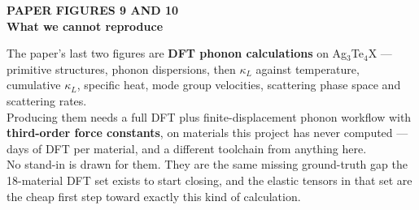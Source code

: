 \documentclass[aspectratio=169]{beamer}
\begin{document}
\begingroup
{}
\begin{frame}[plain]
\vspace{0.9cm}
\begin{center}
{\color{SlideAmber}\bfseries\sffamily\large PAPER FIGURES 9 AND 10}\\[8pt]
{\color{white}\bfseries\headingfont\fontsize{25}{30}\selectfont
  What we cannot reproduce}\\[12pt]
\begin{minipage}{0.80\linewidth}
{\color{Subtle}\sffamily\footnotesize
The paper's last two figures are \textbf{DFT phonon calculations} on
Ag$_3$Te$_4$X --- primitive structures, phonon dispersions, then $\kappa_L$
against temperature, cumulative $\kappa_L$, specific heat, mode group
velocities, scattering phase space and scattering rates.\\[8pt]
Producing them needs a full DFT plus finite-displacement phonon workflow with
\textbf{third-order force constants}, on materials this project has never
computed --- days of DFT per material, and a different toolchain from anything
here.\\[8pt]
{\color{white}No stand-in is drawn for them.} They are the same missing
ground-truth gap the 18-material DFT set exists to start closing, and the
elastic tensors in that set are the cheap first step toward exactly this kind
of calculation.}
\end{minipage}
\end{center}
\end{frame}
\endgroup
\end{document}
